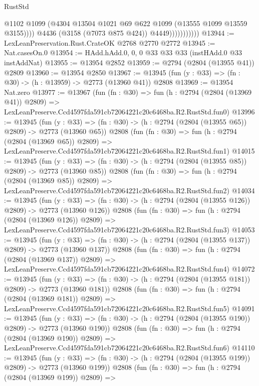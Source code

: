 \begin{lexlean}{RustStd}
\begin{coremodule}
                              @1102
                              @1099
                              (@4304 @13504 @1021 @69 @622 @1099 (@13555 @1099 @13559 @3155))))
                          @4436
                          (@3158 (@7073 @875 @424))
                          @4449)))))))))))
@13944 := LexLeanPreservation.Rust.CrateOK @2768 @2770 @2772
@13945 := Nat.casesOn.{0}
@13954 := HAdd.hAdd.{0, 0, 0} @33 @33 @33 (instHAdd.{0} @33 instAddNat)
@13955 := @13954 @2852
@13959 := @2794 (@2804 (@13955 @41)) @2809
@13960 := @13954 @2850
@13967 := @13945 (fun (y : @33) => (fn : @30) -> (h : @13959) -> @2773 (@13960 @41)) @2808
@13969 := @13954 Nat.zero
@13977 := @13967
    (fun (fn : @30) =>
    fun (h : @2794 (@2804 (@13969 @41)) @2809) =>
    LexLeanPreserve.Ccd4597fda591cb72064221c20c6468ba.R2.RustStd.fun0)
@13996 := @13945
    (fun (y : @33) => (fn : @30) -> (h : @2794 (@2804 (@13955 @65)) @2809) -> @2773 (@13960 @65))
    @2808
    (fun (fn : @30) =>
    fun (h : @2794 (@2804 (@13969 @65)) @2809) =>
    LexLeanPreserve.Ccd4597fda591cb72064221c20c6468ba.R2.RustStd.fun1)
@14015 := @13945
    (fun (y : @33) => (fn : @30) -> (h : @2794 (@2804 (@13955 @85)) @2809) -> @2773 (@13960 @85))
    @2808
    (fun (fn : @30) =>
    fun (h : @2794 (@2804 (@13969 @85)) @2809) =>
    LexLeanPreserve.Ccd4597fda591cb72064221c20c6468ba.R2.RustStd.fun2)
@14034 := @13945
    (fun (y : @33) => (fn : @30) -> (h : @2794 (@2804 (@13955 @126)) @2809) -> @2773 (@13960 @126))
    @2808
    (fun (fn : @30) =>
    fun (h : @2794 (@2804 (@13969 @126)) @2809) =>
    LexLeanPreserve.Ccd4597fda591cb72064221c20c6468ba.R2.RustStd.fun3)
@14053 := @13945
    (fun (y : @33) => (fn : @30) -> (h : @2794 (@2804 (@13955 @137)) @2809) -> @2773 (@13960 @137))
    @2808
    (fun (fn : @30) =>
    fun (h : @2794 (@2804 (@13969 @137)) @2809) =>
    LexLeanPreserve.Ccd4597fda591cb72064221c20c6468ba.R2.RustStd.fun4)
@14072 := @13945
    (fun (y : @33) => (fn : @30) -> (h : @2794 (@2804 (@13955 @181)) @2809) -> @2773 (@13960 @181))
    @2808
    (fun (fn : @30) =>
    fun (h : @2794 (@2804 (@13969 @181)) @2809) =>
    LexLeanPreserve.Ccd4597fda591cb72064221c20c6468ba.R2.RustStd.fun5)
@14091 := @13945
    (fun (y : @33) => (fn : @30) -> (h : @2794 (@2804 (@13955 @190)) @2809) -> @2773 (@13960 @190))
    @2808
    (fun (fn : @30) =>
    fun (h : @2794 (@2804 (@13969 @190)) @2809) =>
    LexLeanPreserve.Ccd4597fda591cb72064221c20c6468ba.R2.RustStd.fun6)
@14110 := @13945
    (fun (y : @33) => (fn : @30) -> (h : @2794 (@2804 (@13955 @199)) @2809) -> @2773 (@13960 @199))
    @2808
    (fun (fn : @30) =>
    fun (h : @2794 (@2804 (@13969 @199)) @2809) =>

\end{coremodule}
\end{lexlean}
